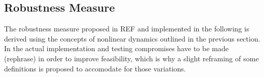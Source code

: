 




     
     

    

    

\subsection{Robustness Measure}

    The robustness measure proposed in REF and implemented in the following is derived using the concepts of nonlinear dynamics outlined in the previous section. In the actual implementation and testing compromises have to be made (rephrase) in order to improve feasibility, which is why a slight reframing of some definitions is proposed to accomodate for those variations.
    
